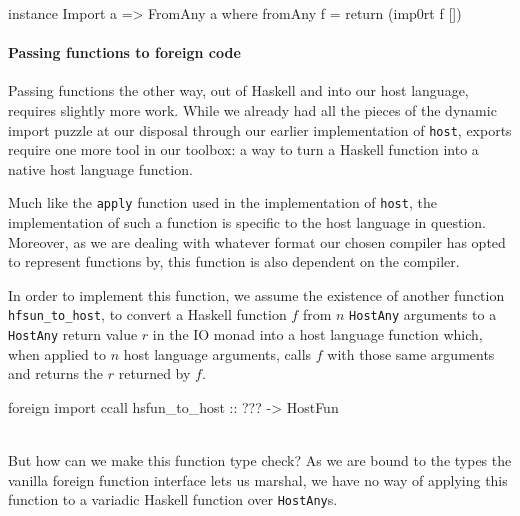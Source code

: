 \documentclass[preprint]{sigplanconf}
\begin{document}
\begin{code}
  instance Import a => FromAny a where
    fromAny f = return (imp0rt f [])
\end{code}

\paragraph{Passing functions to foreign code}
Passing functions the other way, out of Haskell and into our host language,
requires slightly more work. While we already had all the pieces of the
dynamic import puzzle at our disposal through our earlier implementation of
\lstinline!host!, exports require one more tool in our toolbox: a way to turn
a Haskell function into a native host language function.

Much like the \lstinline!apply! function used in the implementation of
\lstinline!host!, the implementation of such a function is specific to the
host language in question. Moreover, as we are dealing with whatever format
our chosen compiler has opted to represent functions by, this function is also
dependent on the compiler.

In order to implement this function, we assume the existence of another
function \lstinline!hfsun_to_host!, to convert a Haskell function $f$ from $n$
\lstinline!HostAny! arguments to a \lstinline!HostAny! return value $r$ in the
IO monad into a host language function which, when applied to $n$ host
language arguments, calls $f$ with those same arguments and returns the $r$
returned by $f$.\\
\begin{code}
  foreign import ccall
    hsfun_to_host :: ??? -> HostFun
\end{code}\\
But how can we make this function type check?
As we are bound to the types the vanilla foreign function interface lets us
marshal, we have no way of applying this function to a variadic Haskell
function over \lstinline!HostAny!s.
\end{document}
